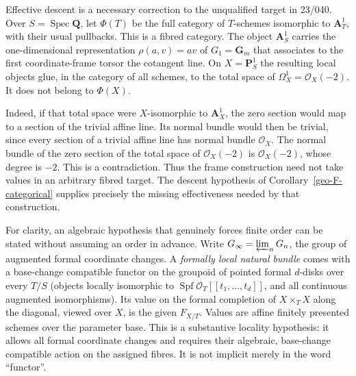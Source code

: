 \begin{example}
\label{geo-F-descent}
Effective descent is a necessary correction to the unqualified target in
23/040. Over $S=\operatorname{Spec}\mathbf Q$, let $\Phi(T)$ be the full
category of $T$-schemes isomorphic to $\mathbf A^1_T$, with their usual
pullbacks. This is a fibred category. The object $\mathbf A^1_S$ carries
the one-dimensional representation $\rho(a,v)=av$ of $G_1=\mathbf G_m$ that associates
to the first coordinate-frame torsor the cotangent line. On
$X=\mathbf P^1_S$ the resulting local objects glue, in the category of
all schemes, to the total space of $\Omega^1_X=\mathcal O_X(-2)$.
It does not belong to $\Phi(X)$.

Indeed, if that total space were $X$-isomorphic to $\mathbf A^1_X$, the
zero section would map to a section of the trivial affine line. Its normal
bundle would then be trivial, since every section of a trivial affine
line has normal bundle $\mathcal O_X$. The normal bundle of the zero
section of the total space of $\mathcal O_X(-2)$ is $\mathcal O_X(-2)$,
whose degree is $-2$. This is a contradiction. Thus the frame construction
need not take values in an arbitrary fibred target. The descent hypothesis
of Corollary~\ref{geo-F-categorical} supplies precisely the missing
effectiveness needed by that construction.
\end{example}

For clarity, an algebraic hypothesis that genuinely forces finite order can
be stated without assuming an order in advance. Write
$G_\infty=\varprojlim_nG_n$, the group of augmented formal coordinate
changes. A \emph{formally local natural bundle} comes with a base-change
compatible functor on the groupoid of pointed formal $d$-disks over every
$T/S$ (objects locally isomorphic to
$\operatorname{Spf}\mathcal O_T[[t_1,\ldots,t_d]]$, and all continuous
augmented isomorphisms). Its value on the formal completion of
$X\times_T X$ along the diagonal, viewed over $X$, is the given $F_{X/T}$.
Values are affine finitely presented schemes over the parameter base.
This is a substantive locality hypothesis: it allows all formal coordinate
changes and requires their algebraic, base-change compatible action on the
assigned fibres. It is not implicit merely in the word ``functor''.

